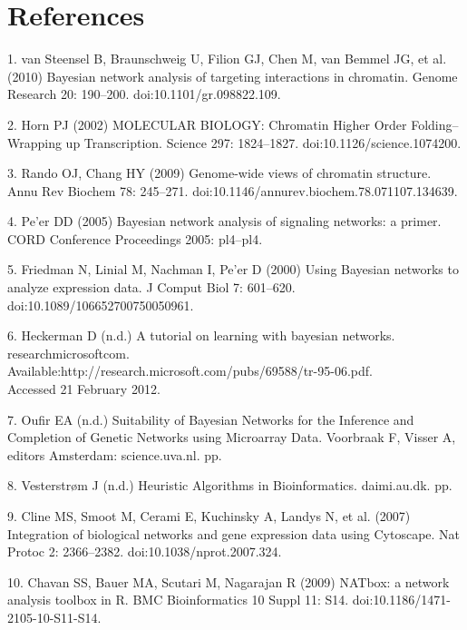 \documentclass{bioinfo}
\begin{document}
\section*{References}
1.	van Steensel B, Braunschweig U, Filion GJ, Chen M, van Bemmel JG, et al. (2010) Bayesian network analysis of targeting interactions in chromatin. Genome Research 20: 190–200. doi:10.1101/gr.098822.109.

2.	Horn PJ (2002) MOLECULAR BIOLOGY: Chromatin Higher Order Folding--Wrapping up Transcription. Science 297: 1824–1827. doi:10.1126/science.1074200.

3.	Rando OJ, Chang HY (2009) Genome-wide views of chromatin structure. Annu Rev Biochem 78: 245–271. doi:10.1146/annurev.biochem.78.071107.134639.

4.	Pe'er DD (2005) Bayesian network analysis of signaling networks: a primer. CORD Conference Proceedings 2005: pl4–pl4.

5.	Friedman N, Linial M, Nachman I, Pe'er D (2000) Using Bayesian networks to analyze expression data. J Comput Biol 7: 601–620. doi:10.1089/106652700750050961.

6.	Heckerman D (n.d.) A tutorial on learning with bayesian networks. researchmicrosoftcom.\\
Available:http://research.microsoft.com/pubs/69588/tr-95-06.pdf.\\
Accessed 21 February 2012.

7.	Oufir EA (n.d.) Suitability of Bayesian Networks for the Inference and Completion of Genetic Networks using Microarray Data. Voorbraak F, Visser A, editors Amsterdam: science.uva.nl. pp.

8.	Vesterstrøm J (n.d.) Heuristic Algorithms in Bioinformatics. daimi.au.dk. pp.

9.	Cline MS, Smoot M, Cerami E, Kuchinsky A, Landys N, et al. (2007) Integration of biological networks and gene expression data using Cytoscape. Nat Protoc 2: 2366–2382. doi:10.1038/nprot.2007.324.

10.	Chavan SS, Bauer MA, Scutari M, Nagarajan R (2009) NATbox: a network analysis toolbox in R. BMC Bioinformatics 10 Suppl 11: S14. doi:10.1186/1471-2105-10-S11-S14.
\end{document}
